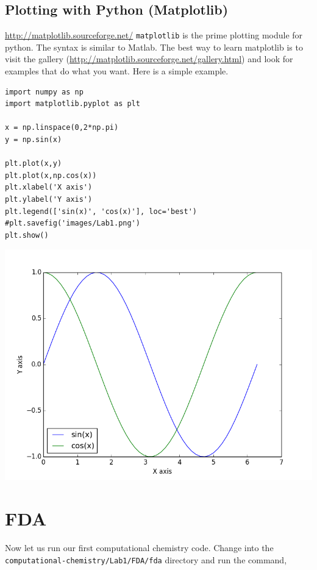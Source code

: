 \documentclass[11pt]{article}
\begin{document}
\subsection{Plotting with Python (Matplotlib)}
\label{sec:orgbad971b}
\url{http://matplotlib.sourceforge.net/}
\texttt{matplotlib} is the prime plotting module for python. The syntax is similar to Matlab. The best way to learn matplotlib is to visit the gallery (\url{http://matplotlib.sourceforge.net/gallery.html}) and look for examples that do what you want. Here is a simple example.

\begin{verbatim}
import numpy as np
import matplotlib.pyplot as plt

x = np.linspace(0,2*np.pi)
y = np.sin(x)

plt.plot(x,y)
plt.plot(x,np.cos(x))
plt.xlabel('X axis')
plt.ylabel('Y axis')
plt.legend(['sin(x)', 'cos(x)'], loc='best')
#plt.savefig('images/Lab1.png')
plt.show()
\end{verbatim}

\begin{center}
\includegraphics[width=.9\linewidth]{./images/Lab1.png}
\end{center}

\section{FDA}
\label{sec:org90be701}

Now let us run our first computational chemistry code. Change into the
\texttt{computational-chemistry/Lab1/FDA/fda} directory and run the command,
\end{document}
